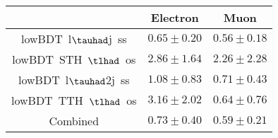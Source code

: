 \centering
\begin{tabular}{|c|c|c|} \hline
 & Electron & Muon\\\hline
lowBDT~l$\tauhad$j~ss & $0.65\pm0.20$ & $0.56\pm0.18$\\\hline
lowBDT~STH~$\tlhad$~os & $2.86\pm1.64$ & $2.26\pm2.28$\\\hline
lowBDT~l$\tauhad$2j~ss & $1.08\pm0.83$ & $0.71\pm0.43$\\\hline
lowBDT~TTH~$\tlhad$~os & $3.16\pm2.02$ & $0.64\pm0.76$\\\hline
Combined & $0.73\pm0.40$ & $0.59\pm0.21$\\\hline
\end{tabular}
